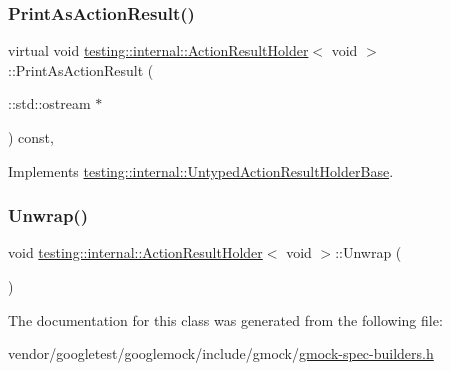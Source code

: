 \mbox{\label{classtesting_1_1internal_1_1_action_result_holder_3_01void_01_4_ab829399d5a7d6fc9f0ecde0c0a6a3aeb}} 
\subsubsection{\texorpdfstring{Print\+As\+Action\+Result()}{PrintAsActionResult()}}
{\footnotesize\ttfamily virtual void \hyperlink{classtesting_1_1internal_1_1_action_result_holder}{testing\+::internal\+::\+Action\+Result\+Holder}$<$ void $>$\+::Print\+As\+Action\+Result (\begin{DoxyParamCaption}\item[{\+::std\+::ostream $\ast$}]{ }\end{DoxyParamCaption}) const\hspace{0.3cm}{\ttfamily [inline]}, {\ttfamily [virtual]}}



Implements \hyperlink{classtesting_1_1internal_1_1_untyped_action_result_holder_base_a4b4a558fcb1d3b02c0fec34f186d3b90}{testing\+::internal\+::\+Untyped\+Action\+Result\+Holder\+Base}.

\mbox{\label{classtesting_1_1internal_1_1_action_result_holder_3_01void_01_4_aa57f371e1559b236e6424b2f50dcd6a2}} 
\subsubsection{\texorpdfstring{Unwrap()}{Unwrap()}}
{\footnotesize\ttfamily void \hyperlink{classtesting_1_1internal_1_1_action_result_holder}{testing\+::internal\+::\+Action\+Result\+Holder}$<$ void $>$\+::Unwrap (\begin{DoxyParamCaption}{ }\end{DoxyParamCaption})\hspace{0.3cm}{\ttfamily [inline]}}



The documentation for this class was generated from the following file\+:\begin{DoxyCompactItemize}
\item 
vendor/googletest/googlemock/include/gmock/\hyperlink{gmock-spec-builders_8h}{gmock-\/spec-\/builders.\+h}\end{DoxyCompactItemize}
